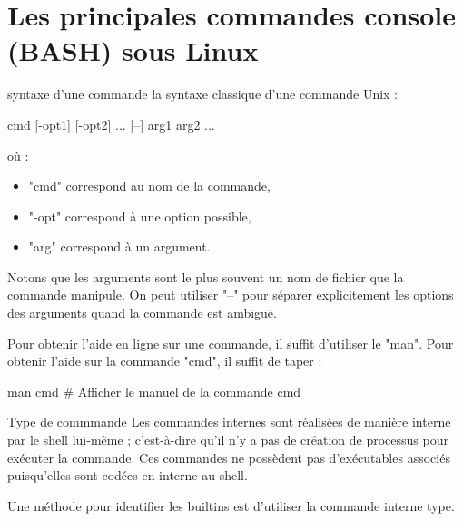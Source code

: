 \documentclass[10pt]{beamer}
\begin{document}
\section{Les principales commandes console (BASH) sous Linux}

\begin{frame}[fragile]{syntaxe d'une commande}
la syntaxe classique d'une commande Unix :

\begin{center}
cmd [-opt1] [-opt2] ... [--] arg1 arg2 ...
\end{center}

où :

\begin{itemize}
\item  "cmd" correspond au nom de la commande,
\item  "-opt" correspond à une option possible,
\item  "arg" correspond à un argument.
\end{itemize}
\pause

Notons que les arguments sont le plus souvent un nom de fichier que la commande manipule. On peut utiliser "--" pour séparer explicitement les options des arguments quand la commande est ambiguë.

Pour obtenir l'aide en ligne sur une commande, il suffit d'utiliser le "man". Pour obtenir l'aide sur la commande "cmd", il suffit de taper :
\begin{mylisting}
man cmd # Afficher le manuel de la commande cmd
\end{mylisting}
\end{frame}

\begin{frame}[fragile]{Type de commmande}
Les commandes internes sont réalisées de manière interne par le shell lui-même ; c'est-à-dire qu'il n'y a pas de création de processus
pour exécuter la commande. Ces commandes ne possèdent pas d'exécutables associés puisqu'elles sont codées en interne au shell.

Une méthode pour identifier les builtins est d'utiliser la commande interne type.
\end{frame}
\end{document}

